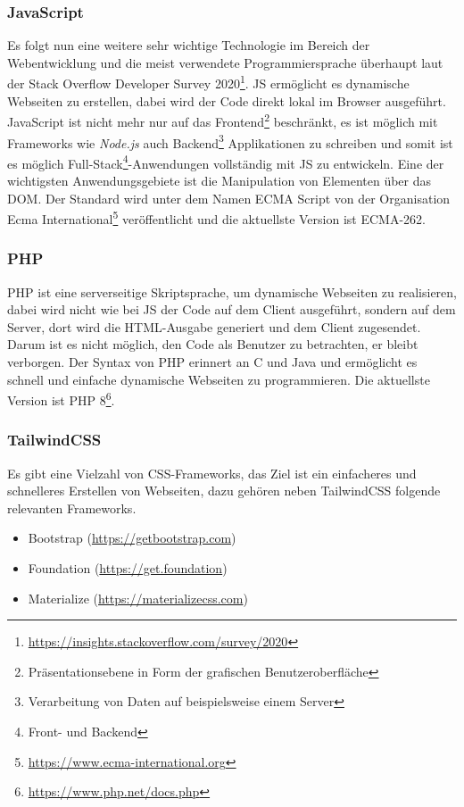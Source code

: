 \subsubsection{JavaScript}
Es folgt nun eine weitere sehr wichtige Technologie im Bereich der
Webentwicklung und die meist verwendete Programmiersprache überhaupt laut der
Stack Overflow Developer Survey
2020\footnote{\url{https://insights.stackoverflow.com/survey/2020}}. \ac*{JS}
ermöglicht es dynamische Webseiten zu erstellen, dabei wird der Code direkt
lokal im Browser ausgeführt. JavaScript ist nicht mehr nur auf das
Frontend\footnote{Präsentationsebene in Form der grafischen Benutzeroberfläche}
beschränkt, es ist möglich mit Frameworks wie \textit{Node.js} auch
Backend\footnote{Verarbeitung von Daten auf beispielsweise einem Server}
Applikationen zu schreiben und somit ist es möglich Full-Stack\footnote{Front-
und Backend}-Anwendungen vollständig mit \acl*{JS} zu entwickeln. Eine der
wichtigsten Anwendungsgebiete ist die Manipulation von Elementen über das
\ac*{DOM}. Der Standard wird unter dem Namen ECMA Script von der Organisation
Ecma International\footnote{\url{https://www.ecma-international.org}}
veröffentlicht und die aktuellste Version ist ECMA-262.

\subsubsection{PHP}
\ac*{PHP} ist eine serverseitige Skriptsprache, um dynamische Webseiten zu realisieren, dabei
wird nicht wie bei \acl*{JS} der Code auf dem Client ausgeführt, sondern auf dem
Server, dort wird die HTML-Ausgabe generiert und dem Client zugesendet. Darum
ist es nicht möglich, den Code als Benutzer zu betrachten, er bleibt verborgen. Der Syntax von PHP
erinnert an C und Java und ermöglicht es schnell und einfache dynamische
Webseiten zu programmieren. Die aktuellste Version ist
\acs*{PHP} 8\footnote{\url{https://www.php.net/docs.php}}.


\subsubsection{TailwindCSS}
Es gibt eine Vielzahl von CSS-Frameworks, das Ziel ist ein einfacheres und
schnelleres Erstellen von Webseiten, dazu gehören neben TailwindCSS folgende
relevanten Frameworks.

\begin{itemize}
  \item Bootstrap (\url{https://getbootstrap.com})
  \item Foundation (\url{https://get.foundation})
  \item Materialize (\url{https://materializecss.com})
\end{itemize}

